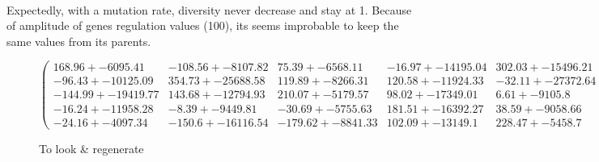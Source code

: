 \documentclass[]{report} %
\begin{document}
    \paragraph*{}
    Expectedly, with a mutation rate, diversity never decrease and stay at 1. Because of amplitude of genes regulation values (100), its seems improbable to 
    keep the same values from its parents.

    \begin{figure}[H] 
            \centering
            \small
    $
            \begin{pmatrix}
                    168.96 +- 6095.41 & -108.56 +- 8107.82 & 75.39 +- 6568.11 & -16.97 +- 14195.04 & 302.03 +- 15496.21 \\
                    -96.43 +- 10125.09 & 354.73 +- 25688.58 & 119.89 +- 8266.31 & 120.58 +- 11924.33 & -32.11 +- 27372.64 \\
                    -144.99 +- 19419.77 & 143.68 +- 12794.93 & 210.07 +- 5179.57 & 98.02 +- 17349.01 & 6.61 +- 9105.8 \\
                    -16.24 +- 11958.28 & -8.39 +- 9449.81 & -30.69 +- 5755.63 & 181.51 +- 16392.27 & 38.59 +- 9058.66 \\
                    -24.16 +- 4097.34 & -150.6 +- 16116.54 & -179.62 +- 8841.33 & 102.09 +- 13149.1 & 228.47 +- 5458.7 
            \end{pmatrix}
    $
            \caption{To look \& regenerate}
            \label{mat:ps200xg300xmr1-10-0}
    \end{figure}
\end{document}
